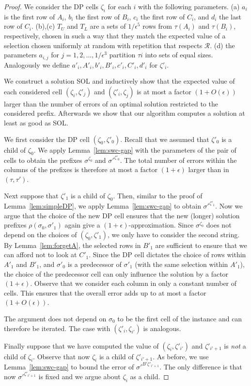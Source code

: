 \begin{proof}
    We consider the DP cells $\zeta_i$ for each $i$ with the following parameters.
    (a) $a_i$ is the first row of $A_i$, $b_i$ the first row of $B_i$, $c_i$ the first row of $C_i$, and $d_i$ the last row of $C_i$.
    (b),(c) $T_U$ and $T_L$ are a sets of $1/\epsilon^5$ rows from $\tau(A_i)$ and $\tau(B_i)$, respectively,
    chosen in such a way that they match the expected value of a selection chosen uniformly at random with repetition that respects $\mathcal{R}$. 
    (d) the parameters $a_{i,j}$ for $j = 1,2,\dotsc,1/\epsilon^3$ partition $\tau{i}$ into sets of equal sizes.
    Analogously we define $a'_i, A'_i, b'_i, B'_i, c'_i, C'_i, d'_i$ for $\zeta'_i$.

    We construct a solution SOL and inductively show that the expected value of each considered cell $(\zeta_i,\zeta'_j)$ and $(\zeta'_i,\zeta_j)$ is at most a factor $(1+O(\epsilon))$ larger than the number of errors of an optimal solution restricted to the considered prefix. 
    Afterwards we show that our algorithm computes a solution at least as good as SOL.
    
    We first consider the DP cell $(\zeta_0,\zeta'_0)$.
    Recall that we assumed \WLOG that $\zeta'_0$ is a child of $\zeta_0$.
    We apply Lemma~\ref{lem:swc-gap} with the parameters of the pair of cells to obtain the prefixes $\sigma^{\zeta_0}$ and $\sigma'^{\zeta'_0}$.
    The total number of errors within the columns of the prefixes is therefore at most a factor $(1+\epsilon)$ larger than in $(\tau,\tau')$.

    Next suppose that $\zeta'_1$ is a child of $\zeta_0$.
    Then, similar to the proof of Lemma~\ref{lem:simpleDP}, we apply Lemma~\ref{lem:swc-gap} to obtain ${\sigma'}^{\zeta'_1}$.
    Now we argue that the choice of the new DP cell ensures that the new (longer) solution prefixes $\rho(\sigma_0,\sigma'_1)$ again give a $(1+\epsilon)$-approximation.
    Since $\sigma^{\zeta_0}$ does not depend on the choices of $(\zeta_0,\zeta'_1)$, we only have to consider the second string.
    By Lemma~\ref{lem:forgetA}, the selected rows in $B'_1$ are sufficient to ensure that we can afford not to look at $C'_1$. 
    Since the DP cell dictates the choice of rows within $A'_1$ and $B'_1$, and $\sigma'_0$ is a predecessor of $\sigma'_1$ (with the same selection within $A'_1$),
    the choice of the predecessor cell can only influence the solution by a factor $(1+\epsilon)$.
    Observe that we consider each column in only a constant number of cells.
    This ensures that the overall error adds up to at most a factor $(1+O(\epsilon))$.
    
    The argument does not depend on $\sigma_0$ to be the first cell of the instance and can therefore be iterated.
    The case with $(\zeta'_i,\zeta_{i'})$ is analogous.

    Finally suppose that we have computed the value of $(\zeta_i,\zeta'_{i'})$ and $\zeta'_{i' + 1}$ is \emph{not} a child of $\zeta_i$.
    Observe that now $\zeta_i$ is a child of $\zeta'_{i' + 1}$.
    As before, we use Lemma~\ref{lem:swc-gap} to bound the error of ${\sigma'}^{B'\zeta'_{i' + 1}}$.
    The only difference is that now ${\sigma'}^{\zeta'_{i'+1}}$ is fixed and we argue about $\zeta_{i}$ as a child.
\end{proof}
